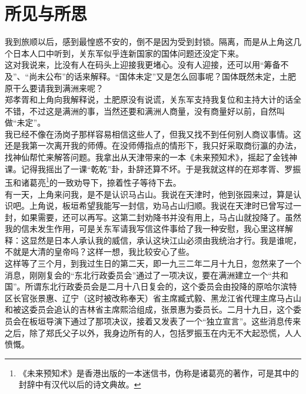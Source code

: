 \fancyhead[RO]{} %
\fancyhead[LE]{} %
\chapter*{所见与所思}
\thispagestyle{empty}
我到旅顺以后，感到最惶惑不安的，倒不是因为受到封锁。隔离，而是从上角这几个日本人口中听到，关东军似乎连新国家的国体问题还没定下来。\\

这对我说来，比没有人在码头上迎接我更堵心。没有人迎接，还可以用“筹备不及”、“尚未公布”的话来解释。“国体未定”又是怎么回事呢？国体既然未定，土肥原干么要请我到满洲来呢？\\

郑孝胥和上角向我解释说，土肥原没有说谎，关东军支持我复位和主持大计的话全不错，不过这是满洲的事，当然还要和满洲人商量，没有商量好以前，自然叫做“未定”。\\

我已经不像在汤岗子那样容易相信这些人了，但我又找不到任何别人商议事情。这还是我第一次离开我的师傅。在没师傅指点的情形下，我只好采取商衍瀛的办法，找神仙帮忙来解答问题。我拿出从天津带来的一本《未来预知术》，摇起了金钱神课。记得我摇出了一课“乾乾”卦，卦辞还算不坏。于是我就这样的在郑孝胥、罗振玉和诸葛亮\footnote{《未来预知术》是香港出版的一本迷信书，伪称是诸葛亮的著作，可是其中的封辞中有汉代以后的诗文典故。}的一致劝导下，捺着性子等待下去。\\

有一天，上角来问我，是不是认识马占山。我说在天津时，他到张园来过，算是认识吧。上角说，板垣希望我能写一封信，劝马占山归顺。我说在天津时已曾写过一封，如果需要，还可以再写。这第二封劝降书并没有用上，马占山就投降了。虽然我的信未发生作用，可是关东军请我写信这件事给了我一种安慰，我心里这样解释：这显然是日本人承认我的威信，承认这块江山必须由我统治才行。我是谁呢，不就是大清的皇帝吗？这样一想，我比较安心了些。\\

这样等了三个月，到我过生日的第二天，即一九三二年二月十九日，忽然来了一个消息，刚刚复会的“东北行政委员会”通过了一项决议，要在满洲建立一个“共和国”。所谓东北行政委员会是二月十八日复会的，这个委员会由投降的原哈尔滨特区长官张景惠、辽宁（这时被改称奉天）省主席臧式毅、黑龙江省代理主席马占山和被这委员会追认的吉林省主席熙洽组成，张景惠为委员长。二月十九日，这个委员会在板垣导演下通过了那项决议，接着又发表了一个“独立宣言”。这些消息传来之后，除了郑氏父子以外，我身边所有的人，包括罗振玉在内无不大起恐慌，人人愤慨。\\

